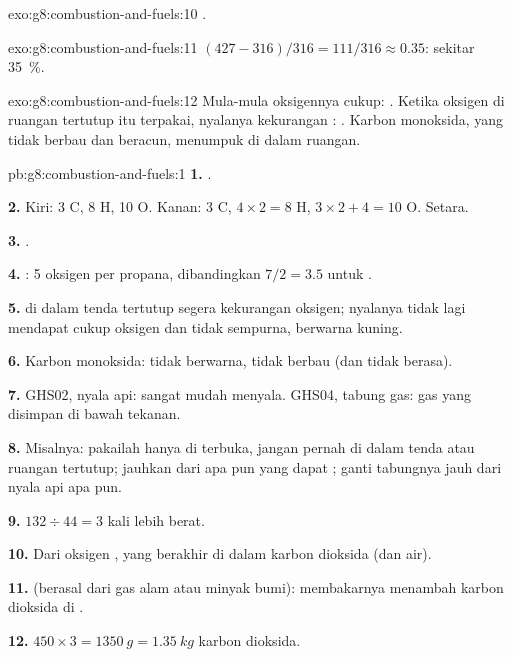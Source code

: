\begin{solution}{exo:g8:combustion-and-fuels:10}
.
\end{solution}

\begin{solution}{exo:g8:combustion-and-fuels:11}
$(427 - 316)/316 = 111/316 \approx 0.35$: sekitar \qty{35}{\percent}.
\end{solution}

\begin{solution}{exo:g8:combustion-and-fuels:12}
Mula-mula oksigennya cukup: . Ketika
oksigen di ruangan tertutup itu terpakai, nyalanya kekurangan :
. Karbon monoksida, yang tidak berbau dan
beracun, menumpuk di dalam ruangan.
\end{solution}

\begin{solution}{pb:g8:combustion-and-fuels:1}
\textbf{1.} .

\textbf{2.} Kiri: 3 C, 8 H, 10 O. Kanan: 3 C, $4 \times 2 = 8$ H,
$3 \times 2 + 4 = 10$ O. Setara.

\textbf{3.} .

\textbf{4.} : 5  oksigen per  propana,
dibandingkan $7/2 = 3.5$ untuk .

\textbf{5.}  di dalam tenda tertutup segera kekurangan oksigen;
nyalanya tidak lagi mendapat cukup oksigen dan  tidak sempurna,
berwarna kuning.

\textbf{6.} Karbon monoksida: tidak berwarna, tidak berbau (dan tidak
berasa).

\textbf{7.} GHS02, nyala api: sangat mudah menyala. GHS04, tabung gas:
gas yang disimpan di bawah tekanan.

\textbf{8.} Misalnya: pakailah hanya di  terbuka, jangan pernah di
dalam tenda atau ruangan tertutup; jauhkan dari apa pun yang dapat
; ganti tabungnya jauh dari nyala api apa pun.

\textbf{9.} $132 \div 44 = 3$ kali lebih berat.

\textbf{10.} Dari oksigen , yang berakhir di dalam karbon dioksida
(dan air).

\textbf{11.}  (berasal dari gas alam atau minyak
bumi): membakarnya menambah karbon dioksida di .

\textbf{12.} $450 \times 3 = \qty{1350}{g} = \qty{1.35}{kg}$ karbon
dioksida.
\end{solution}
